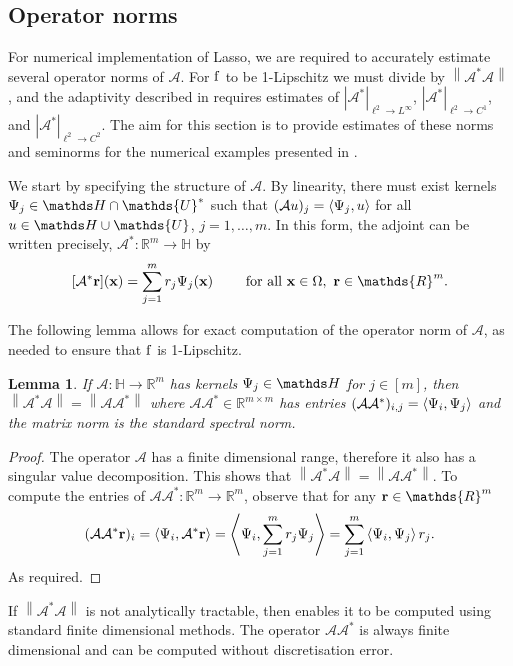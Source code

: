 \documentclass[10pt,a4paper,onecolumn]{article} \usepackage[latin1]{inputenc}
\numberwithin{equation}{section}
\newtheorem{lemma}{Lemma}[section]\newtheorem{example}{Example}[section]
\let\F\mathds\let\C\mathcal\newcommand{\R}{\F{R}}\newcommand{\A}{\C{A}}
\newcommand{\norm}[1]{{\left\lVert #1 \right\rVert}}
\newcommand{\IP}[2]{\left\langle #1,#2 \right\rangle}\newcommand{\ip}[2]{#1 \vcenter{\hbox{\resizebox{6pt}{!}{\ensuremath\cdot}}} #2}
\newcommand{\op}[1]{\operatorname{#1}}\newcommand{\overtext}[2]{\stackrel{\text{#1}}{#2}}
\renewcommand{\vec}{\mathbf}
\newcommand{\UCmath}[1]{%
	\begingroup
	\ucmathlist\uppercase\expandafter{#1}%
	\endgroup
}
\newcommand{\ucmathlist}{%
	\def\alpha{\mathrm{A}}%
	\def\beta{\mathrm{B}}%
	\let\gamma=\Gamma
	\let\delta=\Delta
	\def\epsilon{\mathrm{E}}%
	\def\varepsilon{\mathrm{E}}%
	\def\zeta{\mathrm{Z}}%
	\def\eta{\mathrm{H}}%
	\let\theta=\Theta
	\let\vartheta=\Theta
	\def\iota{\mathrm{I}}%
	\def\kappa{\mathrm{K}}%
	\let\lambda=\Lambda
	\def\mu{\mathrm{M}}%
	\def\nu{\mathrm{N}}%
	\let\xi=\Xi
	\let\pi=\Pi
	\let\varpi=\Pi
	\def\rho{\mathrm{P}}%
	\def\varrho{\mathrm{P}}%
	\let\sigma=\Sigma
	\def\tau{\mathrm{T}}%
	\let\upsilon=\Upsilon
	\let\phi=\Phi
	\let\varphi=\Phi
	\def\chi{\mathrm{X}}%
	\let\psi=\Psi
	\let\omega=\Omega
}
\newcommand{\caps}[1]{\UCmath{#1}}
\newcommand*{\func}[1]{%
	\IfEqCase{#1}{%
		{0}{\op{e}}%
		{1}{\op{f}}%
		{2}{\op{g}}%
		{3}{\op{h}}%
	}[\op{f}#1]%
}
\newcommand*{\varf}[1]{%
	\IfEqCase{#1}{%
		{0}{u}%
		{1}{v}%
		{2}{w}%
	}[u#1]%
}
\newcommand*{\spcf}[1]{%
	\IfEqCase{#1}{%
		{0}{\F{U}}%
		{1}{\F{V}}%
		{2}{\F{W}}%
	}[\F{U}#1]%
}
\newcommand*{\vard}[1]{%
	\IfEqCase{#1}{%
		{0}{\varphi}%
		{1}{\psi}%
	}[\varphi #1]%
}
\newcommand*{\varx}[1]{%
	\IfEqCase{#1}{%
		{0}{x}%
		{1}{y}%
		{2}{z}%
		{3}{r}%
	}[x#1]%
}
\newcommand{\Domain}{\Omega}
\newcommand*{\Varx}[1]{\caps{\varx{#1}}}
\newcommand*{\vvarx}[1]{\vec{\varx{#1}}}\newcommand*{\vVarx}[1]{\vec{\Varx{#1}}}
\begin{document}
\subsection{Operator norms}\label{sec:ca: smoothing operators}
For numerical implementation of Lasso, we are required to accurately estimate several operator norms of $\A$. For $\func1$ to be 1-Lipschitz we must divide by $\norm{\A^*\A}$, and the adaptivity described in  requires estimates of $|\A^*|_{\ell^2\to L^\infty}$, $|\A^*|_{\ell^2\to C^1}$, and $|\A^*|_{\ell^2\to C^2}$. The aim for this section is to provide estimates of these norms and seminorms for the numerical examples presented in .

We start by specifying the structure of $\A$. By linearity, there must exist kernels $\vard1_j\in \F H\cap\spcf0^*$ such that $(\A\varf0)_j = \IP{\vard1_j}{\varf0}$ for all $\varf0\in \F H\cup\spcf0$, $j=1,\ldots,m$. In this form, the adjoint can be written precisely, $\A^*\colon\R^m\to \F H$ by 
$$[\A^*\vvarx3](\vvarx0) = \sum_{j=1}^m \varx3_j\vard1_j(\vvarx0) \qquad \text{ for all }\vvarx0\in\Domain,\ \vvarx3\in\R^m.$$

The following lemma allows for exact computation of the operator norm of $\A$, as needed to ensure that $\func1$ is 1-Lipschitz.
\begin{lemma}\label{thm:ca: norm bound L2}
	If $\A\colon \F H \to \R^m$ has kernels $\vard1_j\in \F H$ for $j\in[m]$, then
	$ \norm{\A^*\A} = \norm{\A\A^*} $
	where $\A\A^*\in\R^{m\times m}$ has entries $(\A\A^*)_{i,j} = \IP{\vard1_i}{\vard1_j}$
	and the matrix norm is the standard spectral norm.
\end{lemma}
\begin{proof}
	The operator $\A$ has a finite dimensional range, therefore it also has a singular value decomposition. This shows that $ \norm{\A^*\A} = \norm{\A\A^*} $. To compute the entries of $\A\A^*\colon\R^m\to\R^m$, observe that for any $\vvarx3\in\R^m$
	$$ (\A\A^*\vvarx3)_i = \IP{\vard1_i}{\A^*\vvarx3} = \IP{\vard1_i}{\sum_{j=1}^m\varx3_j\vard1_j} = \sum_{j=1}^m \IP{\vard1_i}{\vard1_j}\varx3_j.$$
	As required.
\end{proof}
If $\norm{\A^*\A}$ is not analytically tractable, then  enables it to be computed using standard finite dimensional methods. The operator $\A\A^*$ is always finite dimensional and can be computed without discretisation error.
\end{document}

